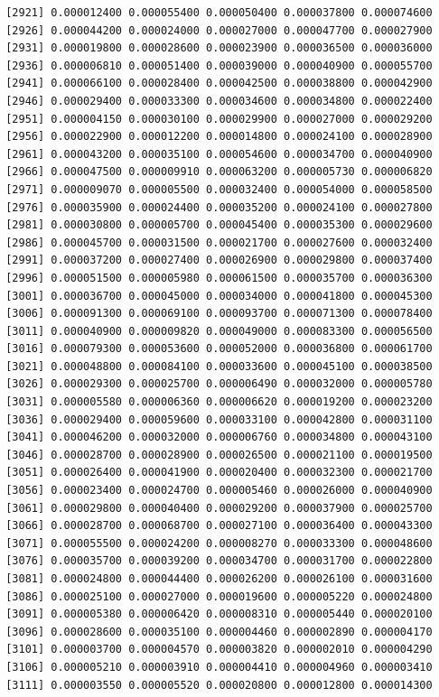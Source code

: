 \documentclass[]{article}
\begin{document}
\begin{verbatim}
 [2921] 0.000012400 0.000055400 0.000050400 0.000037800 0.000074600
 [2926] 0.000044200 0.000024000 0.000027000 0.000047700 0.000027900
 [2931] 0.000019800 0.000028600 0.000023900 0.000036500 0.000036000
 [2936] 0.000006810 0.000051400 0.000039000 0.000040900 0.000055700
 [2941] 0.000066100 0.000028400 0.000042500 0.000038800 0.000042900
 [2946] 0.000029400 0.000033300 0.000034600 0.000034800 0.000022400
 [2951] 0.000004150 0.000030100 0.000029900 0.000027000 0.000029200
 [2956] 0.000022900 0.000012200 0.000014800 0.000024100 0.000028900
 [2961] 0.000043200 0.000035100 0.000054600 0.000034700 0.000040900
 [2966] 0.000047500 0.000009910 0.000063200 0.000005730 0.000006820
 [2971] 0.000009070 0.000005500 0.000032400 0.000054000 0.000058500
 [2976] 0.000035900 0.000024400 0.000035200 0.000024100 0.000027800
 [2981] 0.000030800 0.000005700 0.000045400 0.000035300 0.000029600
 [2986] 0.000045700 0.000031500 0.000021700 0.000027600 0.000032400
 [2991] 0.000037200 0.000027400 0.000026900 0.000029800 0.000037400
 [2996] 0.000051500 0.000005980 0.000061500 0.000035700 0.000036300
 [3001] 0.000036700 0.000045000 0.000034000 0.000041800 0.000045300
 [3006] 0.000091300 0.000069100 0.000093700 0.000071300 0.000078400
 [3011] 0.000040900 0.000009820 0.000049000 0.000083300 0.000056500
 [3016] 0.000079300 0.000053600 0.000052000 0.000036800 0.000061700
 [3021] 0.000048800 0.000084100 0.000033600 0.000045100 0.000038500
 [3026] 0.000029300 0.000025700 0.000006490 0.000032000 0.000005780
 [3031] 0.000005580 0.000006360 0.000006620 0.000019200 0.000023200
 [3036] 0.000029400 0.000059600 0.000033100 0.000042800 0.000031100
 [3041] 0.000046200 0.000032000 0.000006760 0.000034800 0.000043100
 [3046] 0.000028700 0.000028900 0.000026500 0.000021100 0.000019500
 [3051] 0.000026400 0.000041900 0.000020400 0.000032300 0.000021700
 [3056] 0.000023400 0.000024700 0.000005460 0.000026000 0.000040900
 [3061] 0.000029800 0.000040400 0.000029200 0.000037900 0.000025700
 [3066] 0.000028700 0.000068700 0.000027100 0.000036400 0.000043300
 [3071] 0.000055500 0.000024200 0.000008270 0.000033300 0.000048600
 [3076] 0.000035700 0.000039200 0.000034700 0.000031700 0.000022800
 [3081] 0.000024800 0.000044400 0.000026200 0.000026100 0.000031600
 [3086] 0.000025100 0.000027000 0.000019600 0.000005220 0.000024800
 [3091] 0.000005380 0.000006420 0.000008310 0.000005440 0.000020100
 [3096] 0.000028600 0.000035100 0.000004460 0.000002890 0.000004170
 [3101] 0.000003700 0.000004570 0.000003820 0.000002010 0.000004290
 [3106] 0.000005210 0.000003910 0.000004410 0.000004960 0.000003410
 [3111] 0.000003550 0.000005520 0.000020800 0.000012800 0.000014300

\end{verbatim}
\end{document}
